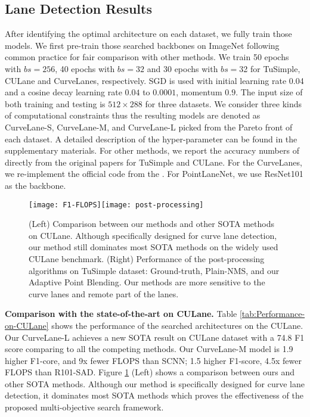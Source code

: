 \documentclass[runningheads]{llncs}
\begin{document}
\textbf{}

\subsection{Lane Detection Results}

After identifying the optimal architecture on each dataset, we fully
train those models. We first pre-train those searched backbones on
ImageNet following common practice \cite{he2016deep} for fair comparison
with other methods. We train 50 epochs with $bs=256$, 40 epochs with
$bs=32$ and 30 epochs with $bs=$32 for TuSimple, CULane and CurveLanes,
respectively. SGD is used with initial learning rate 0.04 and a cosine
decay learning rate $0.04$ to $0.0001$, momentum $0.9$. The input
size of both training and testing is $512\times288$ for three datasets.
We consider three kinds of computational constraints thus the resulting
models are denoted as CurveLane-S, CurveLane-M, and CurveLane-L picked
from the Pareto front of each dataset.  A detailed description of
the hyper-parameter can be found in the supplementary materials. For
other methods, we report the accuracy numbers of \cite{pan2018spatial,hou2019learning}
directly from the original papers for TuSimple and CULane. For the
CurveLanes, we re-implement the official code from the \cite{pan2018spatial,hou2019learning}. For PointLaneNet\cite{chen2019pointlanenet},
we use ResNet101 as the backbone. 

\begin{figure}[tb]


\begin{centering}
{\tiny{}\texttt{[image: F1-FLOPS]}\texttt{[image: post-processing]}}{\tiny\par}
\par\end{centering}


\caption{\label{fig:Performance-of-the-NMS-SWAP}(Left) Comparison between
our methods and other SOTA methods on CULane. Although specifically
designed for curve lane detection, our method still dominates most
SOTA methods on the widely used CULane benchmark. (Right) Performance
of the post-processing algorithms on TuSimple dataset: Ground-truth,
Plain-NMS, and our Adaptive Point Blending. Our methods are more sensitive
to the curve lanes and remote part of the lanes.}


\end{figure}

\textbf{Comparison with the state-of-the-art on CULane.} Table \ref{tab:Performance-on-CULane}
shows the performance of the searched architectures on the CULane.
Our CurveLane-L achieves a new SOTA result on CULane dataset with
a 74.8 F1 score comparing to all the competing methods. Our CurveLane-M
model is 1.9 higher F1-core, and 9x fewer FLOPS than SCNN; 1.5 higher
F1-score, 4.5x fewer FLOPS than R101-SAD. Figure \ref{fig:Performance-of-the-NMS-SWAP}
(Left) shows a comparison between ours and other SOTA methods. Although
our method is specifically designed for curve lane detection, it dominates
most SOTA methods which proves the effectiveness of the proposed multi-objective
search framework. 
\end{document}
